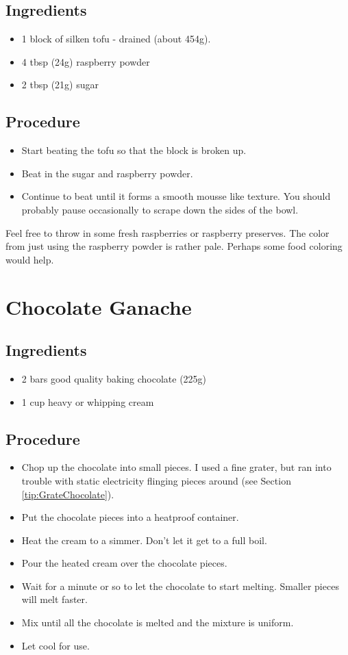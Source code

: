\documentclass[10pt, openany]{book}
\begin{document}
\subsection{Ingredients}
\begin{itemize}
  \item 1 block of silken tofu - drained (about 454g).
  \item 4 tbsp (24g) raspberry powder
  \item 2 tbsp (21g) sugar
\end{itemize}
\subsection{Procedure}
\begin{itemize}
  \item Start beating the tofu so that the block is broken up.
  \item Beat in the sugar and raspberry powder.
  \item Continue to beat until it forms a smooth mousse like texture.  You should probably pause occasionally to scrape down the sides of the bowl.
\end{itemize}
Feel free to throw in some fresh raspberries or raspberry preserves.  The color from just using the raspberry powder is rather pale.  Perhaps some food coloring would help.

\section{Chocolate Ganache}
\label{extra:ChocolateGanache}
\subsection{Ingredients}
\begin{itemize}
  \item 2 bars good quality baking chocolate (225g)
  \item 1 cup heavy or whipping cream
\end{itemize}
\subsection{Procedure}
\begin{itemize}
  \item Chop up the chocolate into small pieces.  I used a fine grater, but ran into trouble with static electricity flinging pieces around (see Section \ref{tip:GrateChocolate}).
  \item Put the chocolate pieces into a heatproof container.
  \item Heat the cream to a simmer.  Don't let it get to a full boil.
  \item Pour the heated cream over the chocolate pieces.
  \item Wait for a minute or so to let the chocolate to start melting.  Smaller pieces will melt faster.
  \item Mix until all the chocolate is melted and the mixture is uniform.
  \item Let cool for use.
\end{itemize}
\end{document}
